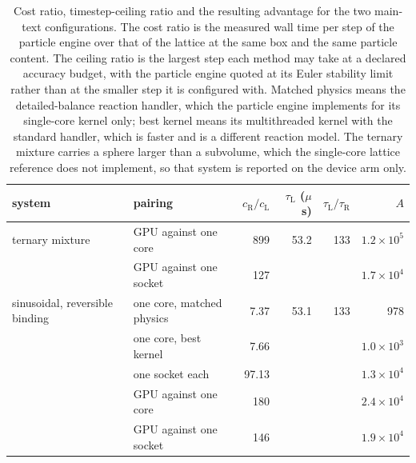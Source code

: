 \begin{table}[htbp]
  \centering
  \caption{Cost ratio, timestep-ceiling ratio and the resulting advantage for the two
  main-text configurations. The cost ratio is the measured wall time per step of the
  particle engine over that of the lattice at the same box and the same particle
  content. The ceiling ratio is the largest step each method may take at a declared
  accuracy budget, with the particle engine quoted at its Euler stability limit
  rather than at the smaller step it is configured with. Matched physics means the
  detailed-balance reaction handler, which the particle engine implements for its
  single-core kernel only; best kernel means its multithreaded kernel with the
  standard handler, which is faster and is a different reaction model. The ternary
  mixture carries a sphere larger than a subvolume, which the single-core lattice
  reference does not implement, so that system is reported on the device arm only.}
  \label{tab:advantage}
  \begin{tabular}{llrrrr}
  \toprule
  system & pairing & $c_{\mathrm{R}}/c_{\mathrm{L}}$ & $\tau_{\mathrm{L}}$ ($\mu$s) & $\tau_{\mathrm{L}}/\tau_{\mathrm{R}}$ & $A$ \\
  \midrule
  ternary mixture & GPU against one core & 899 & 53.2 & 133 & $1.2\times10^{5}$ \\
   & GPU against one socket & 127 &  &  & $1.7\times10^{4}$ \\
  \addlinespace
  sinusoidal, reversible binding & one core, matched physics & 7.37 & 53.1 & 133 & 978 \\
   & one core, best kernel & 7.66 &  &  & $1.0\times10^{3}$ \\
   & one socket each & 97.13 &  &  & $1.3\times10^{4}$ \\
   & GPU against one core & 180 &  &  & $2.4\times10^{4}$ \\
   & GPU against one socket & 146 &  &  & $1.9\times10^{4}$ \\
  \bottomrule
  \end{tabular}
\end{table}
